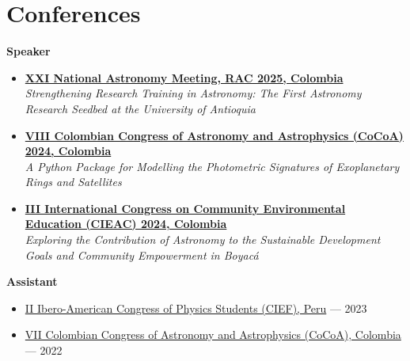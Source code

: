 \section*{Conferences}
\textbf{Speaker}
\begin{itemize}
    \item \href{https://rac.net.co/index.php/encuentro-rac-2025/}{\textbf{XXI National Astronomy Meeting, RAC 2025, Colombia}} \\
    \textit{Strengthening Research Training in Astronomy: The First Astronomy Research Seedbed at the University of Antioquia}

    \item \href{https://jupyterhd.redclara.net/event/45/}{\textbf{VIII Colombian Congress of Astronomy and Astrophysics (CoCoA) 2024, Colombia}} \\
    \textit{A Python Package for Modelling the Photometric Signatures of Exoplanetary Rings and Satellites}

    \item \href{https://www.unicordoba.edu.co/index.php/event/iii-congreso-internacional-de-educacion-ambiental-comunitaria-cieac-2024/}{\textbf{III International Congress on Community Environmental Education (CIEAC) 2024, Colombia}} \\
    \textit{Exploring the Contribution of Astronomy to the Sustainable Development Goals and Community Empowerment in Boyacá}
\end{itemize}

\textbf{Assistant}
\begin{itemize}
    \item \href{https://sites.google.com/view/congresoiberoamericanodefisica/seminars/2023?authuser=0}{II Ibero-American Congress of Physics Students (CIEF), Peru} — 2023
    \item \href{https://www.uptc.edu.co/sitio/portal/cal_not_eve/eventos/det/VII-Congreso-Colombiano-Astronomia-y-Astrofisica-COCOA-Tunja-2022-2022.09.21/?instancedate=1663765200000}{VII Colombian Congress of Astronomy and Astrophysics (CoCoA), Colombia} — 2022
\end{itemize}
